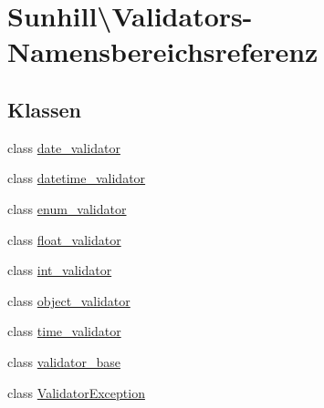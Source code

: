 \hypertarget{namespaceSunhill_1_1Validators}{}\section{Sunhill\textbackslash{}Validators-\/\+Namensbereichsreferenz}
\label{namespaceSunhill_1_1Validators}
\subsection*{Klassen}
\begin{DoxyCompactItemize}
\item 
class \hyperlink{classSunhill_1_1Validators_1_1date__validator}{date\+\_\+validator}
\item 
class \hyperlink{classSunhill_1_1Validators_1_1datetime__validator}{datetime\+\_\+validator}
\item 
class \hyperlink{classSunhill_1_1Validators_1_1enum__validator}{enum\+\_\+validator}
\item 
class \hyperlink{classSunhill_1_1Validators_1_1float__validator}{float\+\_\+validator}
\item 
class \hyperlink{classSunhill_1_1Validators_1_1int__validator}{int\+\_\+validator}
\item 
class \hyperlink{classSunhill_1_1Validators_1_1object__validator}{object\+\_\+validator}
\item 
class \hyperlink{classSunhill_1_1Validators_1_1time__validator}{time\+\_\+validator}
\item 
class \hyperlink{classSunhill_1_1Validators_1_1validator__base}{validator\+\_\+base}
\item 
class \hyperlink{classSunhill_1_1Validators_1_1ValidatorException}{Validator\+Exception}
\end{DoxyCompactItemize}
